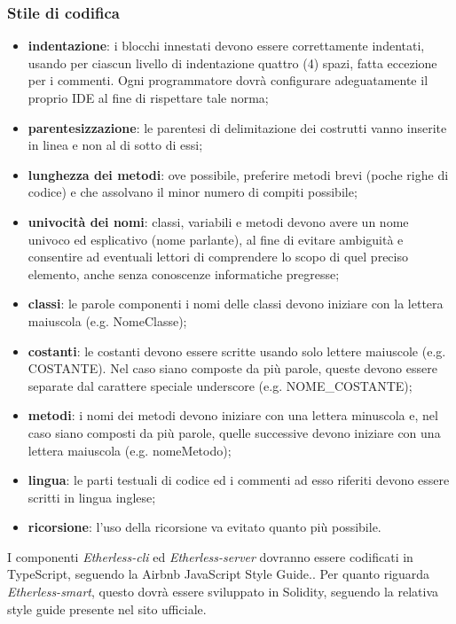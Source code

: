     	\subsubsection*{Stile di codifica}     
   \begin{itemize}
         	\item{\textbf{indentazione}: i blocchi innestati devono essere correttamente indentati, usando per ciascun livello di indentazione quattro (4) spazi, fatta eccezione per i commenti. Ogni programmatore dovrà configurare adeguatamente il proprio IDE al fine di rispettare tale norma;}
		\item{\textbf{parentesizzazione}: le parentesi di delimitazione dei costrutti vanno inserite in linea e non al di sotto di essi;}
		\item{\textbf{lunghezza dei metodi}: ove possibile, preferire metodi brevi (poche righe di codice) e che assolvano il minor numero di compiti possibile;}
		\item{\textbf{univocità dei nomi}: classi, variabili e metodi devono avere un nome univoco ed esplicativo (nome parlante), al fine di evitare ambiguità e consentire ad eventuali lettori di comprendere lo scopo di quel preciso elemento, anche senza conoscenze informatiche pregresse;}
		\item{\textbf{classi}: le parole componenti i nomi delle classi devono iniziare con la lettera maiuscola (e.g. NomeClasse);}
		\item{\textbf{costanti}: le costanti devono essere scritte usando solo lettere maiuscole (e.g. COSTANTE). Nel caso siano composte da più parole, queste devono essere separate dal carattere speciale underscore (e.g. NOME\_COSTANTE);}
		\item{\textbf{metodi}: i nomi dei metodi devono iniziare con una lettera minuscola e, nel caso 	siano composti da più parole, quelle successive devono iniziare con una lettera maiuscola (e.g. nomeMetodo);}
		\item{\textbf{lingua}: le parti testuali di codice ed i commenti ad esso riferiti devono essere scritti in lingua inglese;}
        \item{\textbf{ricorsione}: l'uso della ricorsione va evitato quanto più possibile.}
	\end{itemize}
	
	\noindent I componenti \textit{Etherless-cli} ed \textit{Etherless-server} dovranno essere codificati in TypeScript, seguendo la Airbnb JavaScript Style Guide.. 
	Per quanto riguarda \textit{Etherless-smart}, questo dovrà essere sviluppato in Solidity, seguendo la relativa style guide presente nel sito ufficiale. 
	
